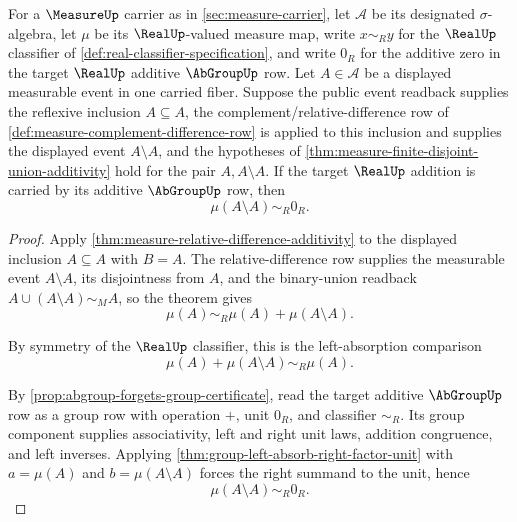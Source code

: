 \begin{theorem}
\label{thm:measure-self-difference-zero-law}
For a $\MeasureUp$ carrier as in \autoref{sec:measure-carrier}, let
$\mathcal{A}$ be its designated $\sigma$-algebra, let $\mu$ be its
$\RealUp$-valued measure map, write $x\sim_R y$ for the $\RealUp$ classifier
of \autoref{def:real-classifier-specification}, and write $0_R$ for the
additive zero in the target $\RealUp$ additive $\AbGroupUp$ row. Let
$A\in\mathcal{A}$ be a displayed measurable event in one carried fiber.
Suppose the public event readback supplies the reflexive inclusion
$A\subseteq A$, the complement/relative-difference row of
\autoref{def:measure-complement-difference-row} is applied to this inclusion
and supplies the displayed event $A\setminus A$, and the hypotheses of
\autoref{thm:measure-finite-disjoint-union-additivity} hold for the pair
$A,A\setminus A$. If the target $\RealUp$ addition is carried by its additive
$\AbGroupUp$ row, then
$$
\mu(A\setminus A)\sim_R0_R.
$$
\end{theorem}
\begin{proof}
Apply \autoref{thm:measure-relative-difference-additivity} to the displayed
inclusion $A\subseteq A$ with $B=A$. The relative-difference row supplies the
measurable event $A\setminus A$, its disjointness from $A$, and the
binary-union readback $A\cup(A\setminus A)\sim_M A$, so the theorem gives
$$
\mu(A)\sim_R\mu(A)+\mu(A\setminus A).
$$

By symmetry of the $\RealUp$ classifier, this is the left-absorption comparison
$$
\mu(A)+\mu(A\setminus A)\sim_R\mu(A).
$$

By \autoref{prop:abgroup-forgets-group-certificate}, read the target additive
$\AbGroupUp$ row as a group row with operation $+$, unit $0_R$, and classifier
$\sim_R$. Its group component supplies associativity, left and right unit
laws, addition congruence, and left inverses. Applying
\autoref{thm:group-left-absorb-right-factor-unit} with $a=\mu(A)$ and
$b=\mu(A\setminus A)$ forces the right summand to the unit, hence
$$
\mu(A\setminus A)\sim_R0_R.
$$
\end{proof}

